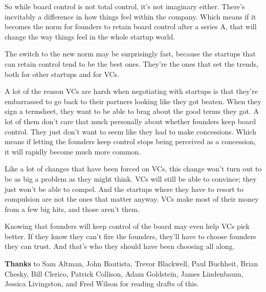 So while board control is not total control, it's not imaginary either.
There's inevitably a difference in how things feel within the company.
Which means if it becomes the norm for founders to retain board control
after a series A, that will change the way things feel in the whole
startup world.

The switch to the new norm may be surprisingly fast, because the
startups that can retain control tend to be the best ones. They're the
ones that set the trends, both for other startups and for VCs.

A lot of the reason VCs are harsh when negotiating with startups is that
they're embarrassed to go back to their partners looking like they got
beaten. When they sign a termsheet, they want to be able to brag about
the good terms they got. A lot of them don't care that much personally
about whether founders keep board control. They just don't want to seem
like they had to make concessions. Which means if letting the founders
keep control stops being perceived as a concession, it will rapidly
become much more common.

Like a lot of changes that have been forced on VCs, this change won't
turn out to be as big a problem as they might think. VCs will still be
able to convince; they just won't be able to compel. And the startups
where they have to resort to compulsion are not the ones that matter
anyway. VCs make most of their money from a few big hits, and those
aren't them.

Knowing that founders will keep control of the board may even help VCs
pick better. If they know they can't fire the founders, they'll have to
choose founders they can trust. And that's who they should have been
choosing all along.

\textbf{Thanks} to Sam Altman, John Bautista, Trevor Blackwell, Paul
Buchheit, Brian Chesky, Bill Clerico, Patrick Collison, Adam Goldstein,
James Lindenbaum, Jessica Livingston, and Fred Wilson for reading drafts
of this.
